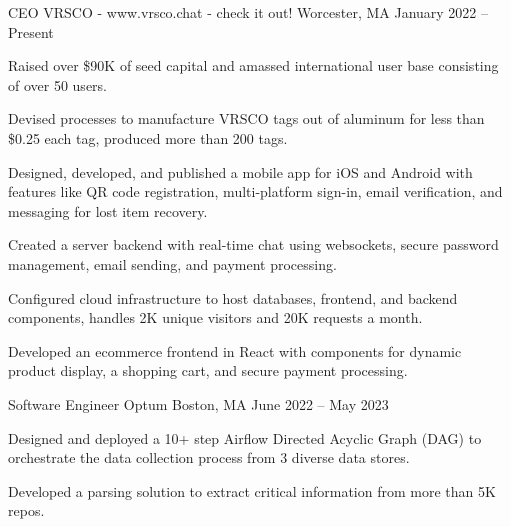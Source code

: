 

\begin{cventries}

  \cventry
    {CEO} %
    {VRSCO - www.vrsco.chat - check it out!} %
    {Worcester, MA} %
    {January 2022 – Present}
    {
      \begin{cvitems} %
      \item {Raised over \$90K of seed capital and amassed international user base consisting of over 50 users.}
      \item {Devised processes to manufacture VRSCO tags out of aluminum for less than \$0.25 each tag, produced more than 200 tags.}
      \item {Designed, developed, and published a mobile app for iOS and Android with features like QR code registration, multi-platform sign-in, email verification, and messaging for lost item recovery.}
      \item {Created a server backend with real-time chat using websockets, secure password management, email sending, and payment processing.}
      \item {Configured cloud infrastructure to host databases, frontend, and backend components, handles 2K unique visitors and 20K requests a month.}
      \item {Developed an ecommerce frontend in React with components for dynamic product display, a shopping cart, and secure payment processing.}
      \end{cvitems}
    }
  \cventry
    {Software Engineer} %
    {Optum} %
    {Boston, MA} %
    {June 2022 – May 2023} %
    {
      \begin{cvitems} %
        \item {Designed and deployed a 10+ step Airflow Directed Acyclic Graph (DAG) to orchestrate the data collection process from 3 diverse data stores.}
        \item {Developed a parsing solution to extract critical information from more than 5K repos.}

\end{cvitems}}
\end{cventries}
